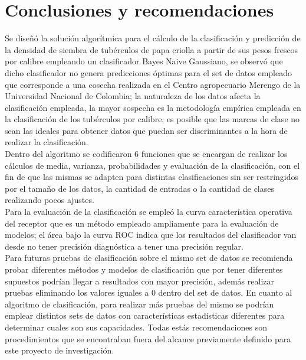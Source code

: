 \chapter{Conclusiones y recomendaciones}

Se diseñó la solución algorítmica para el cálculo de la clasificación y predicción de la densidad
de siembra de tubérculos de papa criolla a partir de sus pesos frescos por calibre empleando
un clasificador Bayes Naive Gaussiano, se observó que dicho clasificador no genera predicciones
óptimas para el set de datos empleado que corresponde a una cosecha realizada en el Centro
agropecuario Merengo de la Universidad Nacional de Colombia; la naturaleza de los datos afecta
la clasificación empleada, la mayor sospecha es la metodología empírica empleada en la
clasificación de los tubérculos por calibre, es posible que las marcas de clase no sean las
ideales para obtener datos que puedan ser discriminantes a la hora de realizar la clasificación.\\

Dentro del algoritmo se codificaron 6 funciones que se encargan de realizar los cálculos de media,
varianza, probabilidades y evaluación de la clasificación, con el fin de que las mismas se adapten
para distintas clasificaciones sin ser restringidos por el tamaño de los datos, la cantidad de
entradas o la cantidad de clases realizando pocos ajustes.\\

Para la evaluación de la clasificación se empleó la curva característica operativa del receptor
que es un método empleado ampliamente para la evaluación de modelos; el área bajo la curva ROC
indica que los resultados del clasificador van desde no tener precisión diagnóstica a tener una
precisión regular.\\

Para futuras pruebas de clasificación sobre el mismo set de datos se recomienda probar diferentes
métodos y modelos de clasificación que por tener diferentes supuestos podrían llegar a resultados
con mayor precisión, además realizar pruebas eliminando los valores iguales a 0 dentro del set de datos. En cuanto al algoritmo de clasificación, para realizar más pruebas del mismo se podrían emplear
distintos sets de datos con características estadísticas diferentes para determinar cuales son
sus capacidades. Todas estás recomendaciones son procedimientos que se encontraban fuera del alcance
previamente definido para este proyecto de investigación.\\

